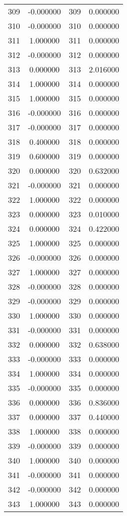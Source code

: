 \documentclass[12pt]{article}
\begin{document}
\begin{longtable}{@{}cccc@{}}
309 & -0.000000 & 309 & 0.000000 \\
310 & -0.000000 & 310 & 0.000000 \\
311 & 1.000000 & 311 & 0.000000 \\
312 & -0.000000 & 312 & 0.000000 \\
313 & 0.000000 & 313 & 2.016000 \\
314 & 1.000000 & 314 & 0.000000 \\
315 & 1.000000 & 315 & 0.000000 \\
316 & -0.000000 & 316 & 0.000000 \\
317 & -0.000000 & 317 & 0.000000 \\
318 & 0.400000 & 318 & 0.000000 \\
319 & 0.600000 & 319 & 0.000000 \\
320 & 0.000000 & 320 & 0.632000 \\
321 & -0.000000 & 321 & 0.000000 \\
322 & 1.000000 & 322 & 0.000000 \\
323 & 0.000000 & 323 & 0.010000 \\
324 & 0.000000 & 324 & 0.422000 \\
325 & 1.000000 & 325 & 0.000000 \\
326 & -0.000000 & 326 & 0.000000 \\
327 & 1.000000 & 327 & 0.000000 \\
328 & -0.000000 & 328 & 0.000000 \\
329 & -0.000000 & 329 & 0.000000 \\
330 & 1.000000 & 330 & 0.000000 \\
331 & -0.000000 & 331 & 0.000000 \\
332 & 0.000000 & 332 & 0.638000 \\
333 & -0.000000 & 333 & 0.000000 \\
334 & 1.000000 & 334 & 0.000000 \\
335 & -0.000000 & 335 & 0.000000 \\
336 & 0.000000 & 336 & 0.836000 \\
337 & 0.000000 & 337 & 0.440000 \\
338 & 1.000000 & 338 & 0.000000 \\
339 & -0.000000 & 339 & 0.000000 \\
340 & 1.000000 & 340 & 0.000000 \\
341 & -0.000000 & 341 & 0.000000 \\
342 & -0.000000 & 342 & 0.000000 \\
343 & 1.000000 & 343 & 0.000000 \\

\end{longtable}
\end{document}
